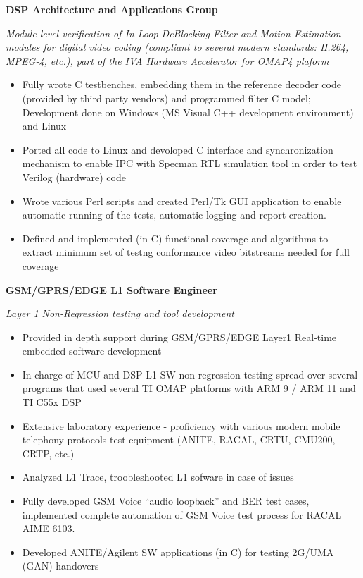 \documentclass[a4paper, oneside, final]{scrartcl}
\begin{document}
\medskip
   
   \textbf{DSP Architecture and Applications Group}
   \smallskip

   \textit{Module-level verification of In-Loop DeBlocking Filter and 
      Motion Estimation modules for digital video coding (compliant to several 
      modern standards: H.264, MPEG-4, etc.), part of the 
      IVA Hardware Accelerator for OMAP4 plaform} 

\begin{itemize}
   \item Fully wrote C testbenches, embedding them in the reference 
            decoder code (provided by third party vendors) and 
            programmed filter C model; Development done on Windows 
            (MS Visual C++ development environment) and Linux
   \item Ported all code to Linux and devoloped C interface 
            and synchronization mechanism to enable IPC with Specman RTL 
            simulation tool in order to test Verilog (hardware) code
   \item Wrote various Perl scripts and created Perl/Tk GUI application 
            to enable automatic running of the tests, 
            automatic logging and report creation.
   \item Defined and implemented (in C) functional coverage and algorithms 
               to extract minimum set of testng conformance video 
               bitstreams needed for full coverage
\end{itemize}


   \textbf{GSM/GPRS/EDGE L1 Software Engineer}
   \smallskip

   \textit{Layer 1 Non-Regression testing and tool development}
\begin{itemize}
   \item Provided in depth support during GSM/GPRS/EDGE 
               Layer1 Real-time embedded software development 
   \item In charge of MCU and DSP L1 SW non-regression testing 
            spread over several programs that used several 
            TI OMAP platforms with ARM 9 / ARM 11 and TI C55x DSP
   \item Extensive laboratory experience - proficiency with 
            various modern mobile telephony protocols test 
            equipment (ANITE, RACAL, CRTU, CMU200, CRTP, etc.)
   \item Analyzed L1 Trace, troobleshooted L1 sofware in case of issues
   \item Fully developed GSM Voice “audio loopback” and BER 
            test cases, implemented complete automation of 
            GSM Voice test process for RACAL AIME 6103.
   \item Developed ANITE/Agilent SW applications (in C) for testing 2G/UMA (GAN) handovers
\end{itemize}
\end{document}
